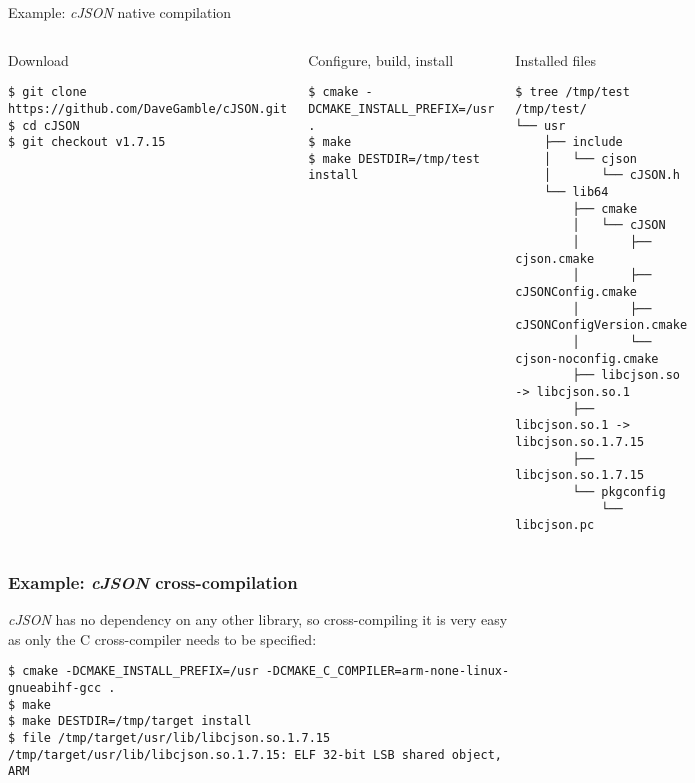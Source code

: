 \begin{frame}[fragile]{Example: {\em cJSON} native compilation}

  \begin{columns}
    \begin{block}{Download}
      {\tiny
\begin{verbatim}
$ git clone https://github.com/DaveGamble/cJSON.git
$ cd cJSON
$ git checkout v1.7.15
\end{verbatim}
      }
    \end{block}

    \begin{block}{Configure, build, install}
      {\tiny
\begin{verbatim}
$ cmake -DCMAKE_INSTALL_PREFIX=/usr .
$ make
$ make DESTDIR=/tmp/test install
\end{verbatim}
      }
    \end{block}
    \begin{block}{Installed files}
      {\tiny
\begin{verbatim}
$ tree /tmp/test
/tmp/test/
└── usr
    ├── include
    │   └── cjson
    │       └── cJSON.h
    └── lib64
        ├── cmake
        │   └── cJSON
        │       ├── cjson.cmake
        │       ├── cJSONConfig.cmake
        │       ├── cJSONConfigVersion.cmake
        │       └── cjson-noconfig.cmake
        ├── libcjson.so -> libcjson.so.1
        ├── libcjson.so.1 -> libcjson.so.1.7.15
        ├── libcjson.so.1.7.15
        └── pkgconfig
            └── libcjson.pc
\end{verbatim}
      }
    \end{block}
  \end{columns}
\end{frame}

\begin{frame}[fragile]
  \frametitle{Example: {\em cJSON} cross-compilation}
  {\em cJSON} has no dependency on any other library, so
  cross-compiling it is very easy as only the C cross-compiler needs
  to be specified:
  \begin{block}{}
    {\tiny
\begin{verbatim}
$ cmake -DCMAKE_INSTALL_PREFIX=/usr -DCMAKE_C_COMPILER=arm-none-linux-gnueabihf-gcc .
$ make
$ make DESTDIR=/tmp/target install
$ file /tmp/target/usr/lib/libcjson.so.1.7.15
/tmp/target/usr/lib/libcjson.so.1.7.15: ELF 32-bit LSB shared object, ARM
\end{verbatim}
    }
  \end{block}
\end{frame}

